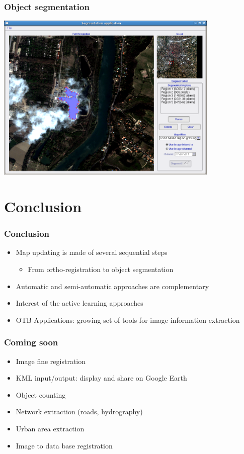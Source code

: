 \documentclass[compress]{beamer}
\begin{document}
\begin{frame}
  \frametitle{Object segmentation}
      \begin{center}
      \includegraphics[width=0.80\textwidth]{Images/seg14.png}
  \end{center}
\end{frame}




\section{Conclusion}
\begin{frame}
  \frametitle{Conclusion}
  \begin{itemize}
    \item Map updating is made of several sequential steps
      \begin{itemize}
	\item From ortho-registration to object segmentation
      \end{itemize}
    \item Automatic and semi-automatic approaches are complementary
    \item Interest of the active learning approaches
    \item OTB-Applications: growing set of tools for image information
    extraction
  \end{itemize}
\end{frame}

\begin{frame}
  \frametitle{Coming soon}
  \begin{itemize}
    \item Image fine registration
    \item KML input/output: display and share on Google Earth
    \item Object counting
    \item Network extraction (roads, hydrography)
    \item Urban area extraction
    \item Image to data base registration
  \end{itemize}
\end{frame}
\end{document}
